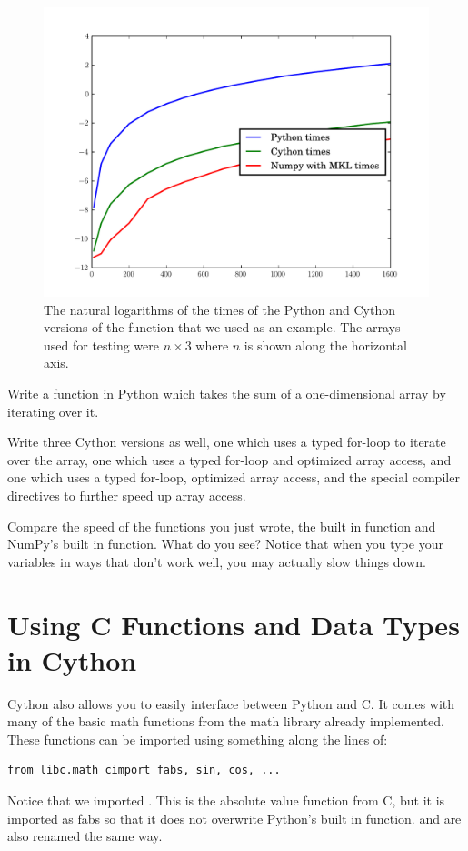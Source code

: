 \begin{figure}
\includegraphics[width=\textwidth]{rowdot.pdf}
\caption{The natural logarithms of the times of the Python and Cython versions of the  function that we used as an example. The arrays used for testing were $n\times 3$ where $n$ is shown along the horizontal axis.}
\label{cython:rowdot}
\end{figure}

\begin{problem}
Write a function in Python which takes the sum of a one-dimensional array by iterating over it.

Write three Cython versions as well, one which uses a typed for-loop to iterate over the array, one which uses a typed for-loop and optimized array access, and one which uses a typed for-loop, optimized array access, and the special compiler directives to further speed up array access.

Compare the speed of the functions you just wrote, the built in  function and NumPy's built in  function.
What do you see?
Notice that when you type your variables in ways that don't work well, you may actually slow things down.
\end{problem}

\section*{Using C Functions and Data Types in Cython}

Cython also allows you to easily interface between Python and C.
It comes with many of the basic math functions from the math library already implemented.
These functions can be imported using something along the lines of:
\begin{lstlisting}
from libc.math cimport fabs, sin, cos, ...
\end{lstlisting}
Notice that we imported .
This is the absolute value function from C, but it is imported as fabs so that it does not overwrite Python's built in  function. 
 and  are also renamed the same way.

